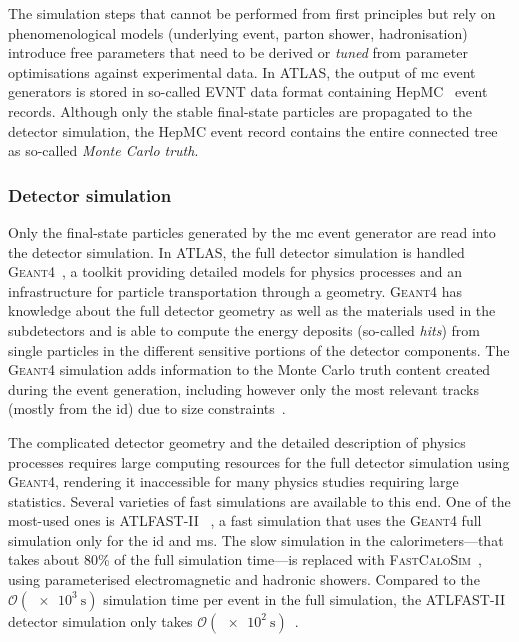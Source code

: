  The simulation steps that cannot be performed from first principles but rely on phenomenological models (underlying event, parton shower, hadronisation) introduce free parameters that need to be derived or \textit{tuned} from parameter optimisations against experimental data. In ATLAS, the output of \gls{mc} event generators is stored in so-called EVNT data format containing HepMC~\cite{Dobbs:2001ck} event records. Although only the stable final-state particles are propagated to the detector simulation, the HepMC event record contains the entire connected tree as so-called \textit{Monte Carlo truth}.
		
\subsubsection{Detector simulation}

Only the final-state particles generated by the \gls{mc} event generator are read into the detector simulation. In ATLAS, the full detector simulation is handled \textsc{Geant4}~\cite{geant:2002hh}, a toolkit providing detailed models for physics processes and an infrastructure for particle transportation through a geometry. \textsc{Geant4} has knowledge about the full detector geometry as well as the materials used in the subdetectors and is able to compute the energy deposits (so-called \textit{hits}) from single particles in the different sensitive portions of the detector components. The \textsc{Geant4} simulation adds information to the Monte Carlo truth content created during the event generation, including however only the most relevant tracks (mostly from the \gls{id}) due to size constraints~\cite{Aad:2010ah}.

The complicated detector geometry and the detailed description of physics processes requires large computing resources for the full detector simulation using \textsc{Geant4}, rendering it inaccessible for many physics studies requiring large statistics. Several varieties of fast simulations are available to this end. One of the most-used ones is \textsc{ATLFAST-II}~\cite{Aad:2010ah} , a fast simulation that uses the \textsc{Geant4} full simulation only for the \gls{id} and \gls{ms}. The slow simulation in the calorimeters---that takes about 80\% of the full simulation time---is replaced with \textsc{FastCaloSim}~\cite{ATL-SOFT-PUB-2018-002}, using parameterised electromagnetic and hadronic showers. Compared to the $\mathcal{O}(\SI{e3}{\second})$ simulation time per event in the full simulation, the \textsc{ATLFAST-II} detector simulation only takes $\mathcal{O}(\SI{e2}{\second})$~\cite{Aad:2010ah}. 

